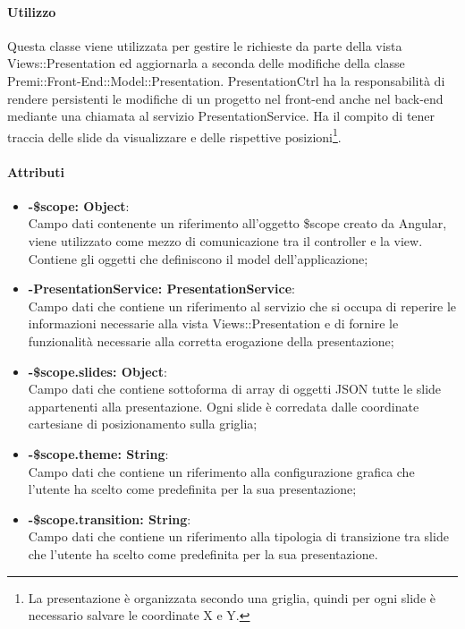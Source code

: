 	\paragraph{Utilizzo}
	Questa classe viene utilizzata per gestire le richieste da parte della vista Views::Presentation ed aggiornarla a seconda delle modifiche della classe Premi::Front-End::Model::Presentation. PresentationCtrl ha la responsabilità di rendere persistenti le modifiche di un progetto nel front-end anche nel back-end mediante una chiamata al servizio PresentationService.
	Ha il compito di tener traccia delle slide da visualizzare e delle rispettive posizioni\footnote{La presentazione è organizzata secondo una griglia, quindi per ogni slide è necessario salvare le coordinate X e Y.}.
	\paragraph{Attributi}
	\begin{itemize}
		\item \textbf{-\$scope: Object}:\\
			Campo dati contenente un riferimento all'oggetto \$scope creato da Angular, viene utilizzato come mezzo di comunicazione tra il controller e la view. Contiene gli oggetti che definiscono il model dell'applicazione;
		\item \textbf{-PresentationService: PresentationService}:\\
			Campo dati che contiene un riferimento al servizio che si occupa di reperire le informazioni necessarie alla vista Views::Presentation e di fornire le funzionalità necessarie alla corretta erogazione della presentazione;
		\item \textbf{-\$scope.slides: Object}:\\
			Campo dati che contiene sottoforma di array di oggetti JSON tutte le slide appartenenti alla presentazione. Ogni slide è corredata dalle coordinate cartesiane di posizionamento sulla griglia;
		
		\item \textbf{-\$scope.theme: String}:\\
			Campo dati che contiene un riferimento alla configurazione grafica che l'utente ha scelto come predefinita per la sua presentazione;
		
		\item \textbf{-\$scope.transition: String}:\\
			Campo dati che contiene un riferimento alla tipologia di transizione tra slide che l'utente ha scelto come predefinita per la sua presentazione.
	\end{itemize}
	
